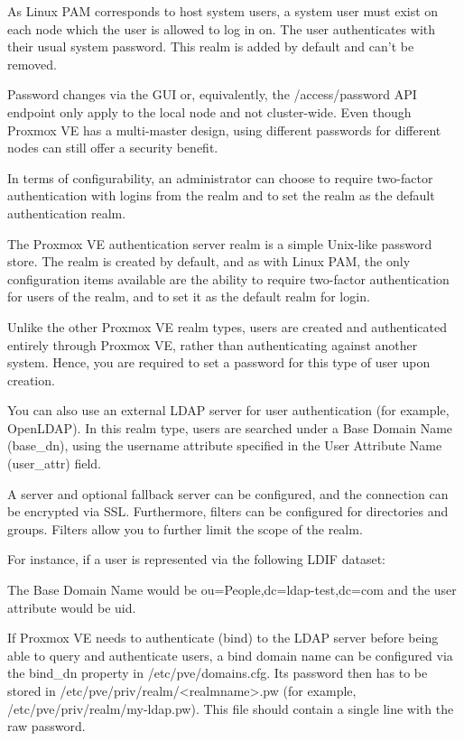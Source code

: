 As Linux PAM corresponds to host system users, a system user must exist on each node which the user is allowed to log in on. The user authenticates with their usual system password. This realm is added by default and can’t be removed.

Password changes via the GUI or, equivalently, the /access/password API endpoint only apply to the local node and not cluster-wide. Even though Proxmox VE has a multi-master design, using different passwords for different nodes can still offer a security benefit.

In terms of configurability, an administrator can choose to require two-factor authentication with logins from the realm and to set the realm as the default authentication realm.

The Proxmox VE authentication server realm is a simple Unix-like password store. The realm is created by default, and as with Linux PAM, the only configuration items available are the ability to require two-factor authentication for users of the realm, and to set it as the default realm for login.

Unlike the other Proxmox VE realm types, users are created and authenticated entirely through Proxmox VE, rather than authenticating against another system. Hence, you are required to set a password for this type of user upon creation.

You can also use an external LDAP server for user authentication (for example, OpenLDAP). In this realm type, users are searched under a Base Domain Name (base_dn), using the username attribute specified in the User Attribute Name (user_attr) field.

A server and optional fallback server can be configured, and the connection can be encrypted via SSL. Furthermore, filters can be configured for directories and groups. Filters allow you to further limit the scope of the realm.

For instance, if a user is represented via the following LDIF dataset:

The Base Domain Name would be ou=People,dc=ldap-test,dc=com and the user attribute would be uid.

If Proxmox VE needs to authenticate (bind) to the LDAP server before being able to query and authenticate users, a bind domain name can be configured via the bind_dn property in /etc/pve/domains.cfg. Its password then has to be stored in /etc/pve/priv/realm/<realmname>.pw (for example, /etc/pve/priv/realm/my-ldap.pw). This file should contain a single line with the raw password.

